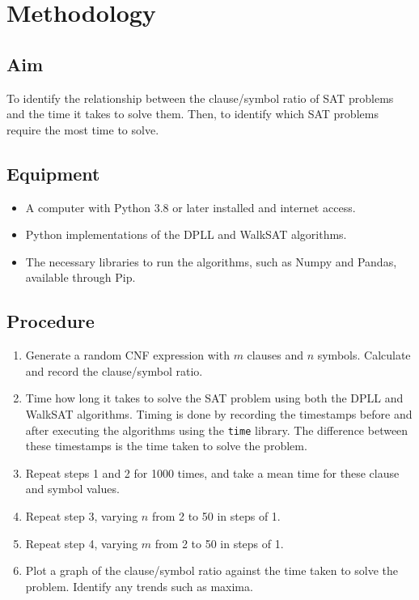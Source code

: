 \documentclass{article}
\begin{document}
    \section{Methodology}

    \subsection{Aim}
    To identify the relationship between the clause/symbol ratio of SAT problems and the time it takes to solve them. Then, to identify which SAT problems require the most time to solve.

    \subsection{Equipment}
    \begin{itemize}
        \item A computer with Python 3.8\supercite{python-lang} or later installed and internet access.
        \item Python implementations of the DPLL and WalkSAT algorithms.
        \item The necessary libraries to run the algorithms, such as Numpy and Pandas, available through Pip.
    \end{itemize}

    \subsection{Procedure}
    \begin{enumerate}
        \item Generate a random CNF expression with $m$ clauses and $n$ symbols. Calculate and record the clause/symbol ratio.
        \item Time how long it takes to solve the SAT problem using both the DPLL and WalkSAT algorithms. Timing is done by recording the timestamps before and after executing the algorithms using the \texttt{time} library. The difference between these timestamps is the time taken to solve the problem.
        \item Repeat steps 1 and 2 for 1000 times, and take a mean time for these clause and symbol values.
        \item Repeat step 3, varying $n$ from 2 to 50 in steps of 1.
        \item Repeat step 4, varying $m$ from 2 to 50 in steps of 1.
        \item Plot a graph of the clause/symbol ratio against the time taken to solve the problem. Identify any trends such as maxima.
    \end{enumerate}
\end{document}
